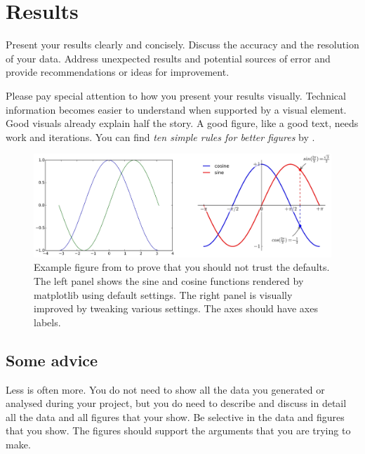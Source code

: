 \documentclass{AEM4602Wreport}
\begin{document}
\section{Results}
Present your results clearly and concisely.
Discuss the accuracy and the resolution of your data. 
Address unexpected results and potential sources of error and provide recommendations or ideas for improvement.

Please pay special attention to how you present your results visually. 
Technical information becomes easier to understand when supported by a visual element. 
Good visuals already explain half the story.
A good figure, like a good text, needs work and iterations. 
You can find \textit{ten simple rules for better figures} by \cite{betterfigures}.

\begin{figure}[tb!]
\includegraphics[width=\textwidth]{badgood}
\caption{Example figure from \cite{betterfigures} to prove that you should not trust the defaults. The left panel shows the sine and cosine functions rendered by matplotlib using default settings. The right panel is visually improved by tweaking various settings. 
The axes should have axes labels. 
}
\label{fig:results}
\end{figure}

\subsection{Some advice}
Less is often more.
You do not need to show all the data you generated or analysed during your project, but you do need to describe and discuss in detail all the data and all figures that your show.
Be selective in the data and figures that you show.
The figures should support the arguments that you are trying to make.


\end{document}
